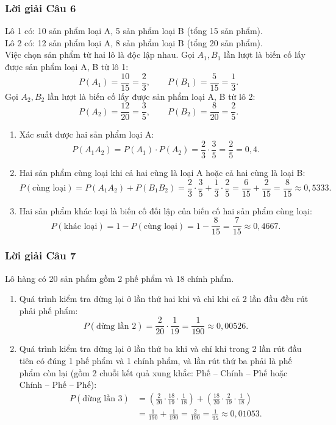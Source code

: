 \documentclass[12pt,a4paper]{article}
\theoremstyle{definition}
\begin{document}
\subsubsection*{Lời giải Câu 6}
Lô 1 có: 10 sản phẩm loại A, 5 sản phẩm loại B (tổng 15 sản phẩm).\\
Lô 2 có: 12 sản phẩm loại A, 8 sản phẩm loại B (tổng 20 sản phẩm).\\
Việc chọn sản phẩm từ hai lô là độc lập nhau.
Gọi $A_1, B_1$ lần lượt là biến cố lấy được sản phẩm loại A, B từ lô 1:
\[
P(A_1) = \frac{10}{15} = \frac{2}{3}, \qquad P(B_1) = \frac{5}{15} = \frac{1}{3}.
\]
Gọi $A_2, B_2$ lần lượt là biến cố lấy được sản phẩm loại A, B từ lô 2:
\[
P(A_2) = \frac{12}{20} = \frac{3}{5}, \qquad P(B_2) = \frac{8}{20} = \frac{2}{5}.
\]
\begin{enumerate}[label=\arabic*.]
    \item Xác suất được hai sản phẩm loại A:
    \[
    P(A_1 A_2) = P(A_1) \cdot P(A_2) = \frac{2}{3} \cdot \frac{3}{5} = \frac{2}{5} = 0{,}4.
    \]
    \item Hai sản phẩm cùng loại khi cả hai cùng là loại A hoặc cả hai cùng là loại B:
    \[
    P(\text{cùng loại}) = P(A_1 A_2) + P(B_1 B_2) = \frac{2}{3} \cdot \frac{3}{5} + \frac{1}{3} \cdot \frac{2}{5} = \frac{6}{15} + \frac{2}{15} = \frac{8}{15} \approx 0{,}5333.
    \]
    \item Hai sản phẩm khác loại là biến cố đối lập của biến cố hai sản phẩm cùng loại:
    \[
    P(\text{khác loại}) = 1 - P(\text{cùng loại}) = 1 - \frac{8}{15} = \frac{7}{15} \approx 0{,}4667.
    \]
\end{enumerate}

\subsubsection*{Lời giải Câu 7}
Lô hàng có 20 sản phẩm gồm 2 phế phẩm và 18 chính phẩm.
\begin{enumerate}[label=\alph*/]
    \item Quá trình kiểm tra dừng lại ở lần thứ hai khi và chỉ khi cả 2 lần đầu đều rút phải phế phẩm:
    \[
    P(\text{dừng lần 2}) = \frac{2}{20} \cdot \frac{1}{19} = \frac{1}{190} \approx 0{,}00526.
    \]
    \item Quá trình kiểm tra dừng lại ở lần thứ ba khi và chỉ khi trong 2 lần rút đầu tiên có đúng 1 phế phẩm và 1 chính phẩm, và lần rút thứ ba phải là phế phẩm còn lại (gồm 2 chuỗi kết quả xung khắc: Phế -- Chính -- Phế hoặc Chính -- Phế -- Phế):
    \begin{align*}
    P(\text{dừng lần 3}) &= \left(\frac{2}{20} \cdot \frac{18}{19} \cdot \frac{1}{18}\right) + \left(\frac{18}{20} \cdot \frac{2}{19} \cdot \frac{1}{18}\right) \\
                        &= \frac{1}{190} + \frac{1}{190} = \frac{2}{190} = \frac{1}{95} \approx 0{,}01053.
    \end{align*}
\end{enumerate}
\end{document}
